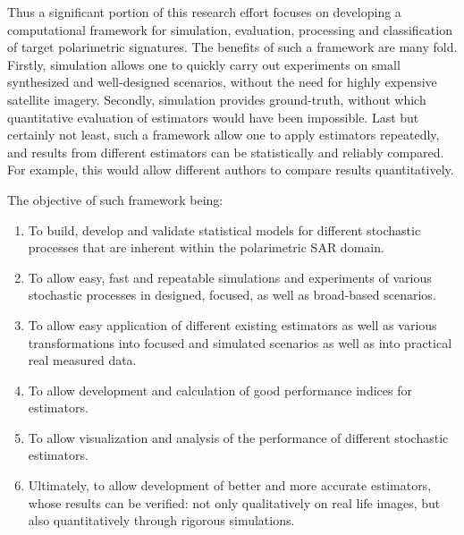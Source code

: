 Thus a significant portion of this research effort focuses on developing a computational framework for simulation, evaluation, processing and classification of target polarimetric signatures.
The benefits of such a framework are many fold.
Firstly, simulation allows one to quickly carry out experiments on small synthesized and well-designed scenarios, without the need for highly expensive satellite imagery.
Secondly, simulation provides ground-truth, without which quantitative evaluation of estimators would have been impossible.
Last but certainly not least, such a framework allow one to apply estimators repeatedly, and results from different estimators can be statistically and reliably compared. For example, this would allow different authors to compare results quantitatively.

The objective of such framework being:
\begin{enumerate}
\item To build, develop and validate statistical models for different stochastic processes that are inherent within the polarimetric SAR domain.
\item To allow easy, fast and repeatable simulations and experiments of various stochastic processes in designed, focused, as well as broad-based scenarios.
\item To allow easy application of different existing estimators as well as various transformations into focused and simulated scenarios as well as into practical real measured data.
\item To allow development and calculation of good performance indices for estimators. 
\item To allow visualization and analysis of the performance of different stochastic estimators.
\item Ultimately, to allow development of better and more accurate estimators, whose results can be verified: not only qualitatively on real life images, but also quantitatively through rigorous simulations.
\end{enumerate}

